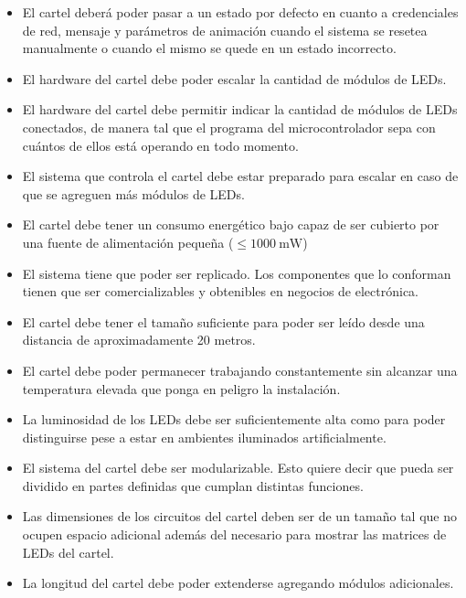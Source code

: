 \begin{itemize}
	\item El cartel deberá poder pasar a un estado por defecto en cuanto a credenciales de red, mensaje y parámetros de animación cuando el sistema se resetea manualmente o cuando el mismo se quede en un estado incorrecto.
	\item El hardware del cartel debe poder escalar la cantidad de módulos de LEDs.
	\item El hardware del cartel debe permitir indicar la cantidad de módulos de LEDs conectados, de manera tal que el programa del microcontrolador sepa con cuántos de ellos está operando en todo momento.
	\item El sistema que controla el cartel debe estar preparado para escalar en caso de que se agreguen más módulos de LEDs.
	\item El cartel debe tener un consumo energético bajo capaz de ser cubierto por una fuente de alimentación pequeña ($\le 1000\ \mbox{mW}$)
	\item El sistema tiene que poder ser replicado. Los componentes que lo conforman tienen que ser comercializables y obtenibles en negocios de electrónica.
	\item El cartel debe tener el tamaño suficiente para poder ser leído desde una distancia de aproximadamente 20 metros.
	\item El cartel debe poder permanecer trabajando constantemente sin alcanzar una temperatura elevada que ponga en peligro la instalación.
	\item La luminosidad de los LEDs debe ser suficientemente alta como para poder distinguirse pese a estar en ambientes iluminados artificialmente.
	\item El sistema del cartel debe ser modularizable. Esto quiere decir que pueda ser dividido en partes definidas que cumplan distintas funciones.
	\item Las dimensiones de los circuitos del cartel deben ser de un tamaño tal que no ocupen espacio adicional además del necesario para mostrar las matrices de LEDs del cartel.
	\item La longitud del cartel debe poder extenderse agregando módulos adicionales.
\end{itemize}

